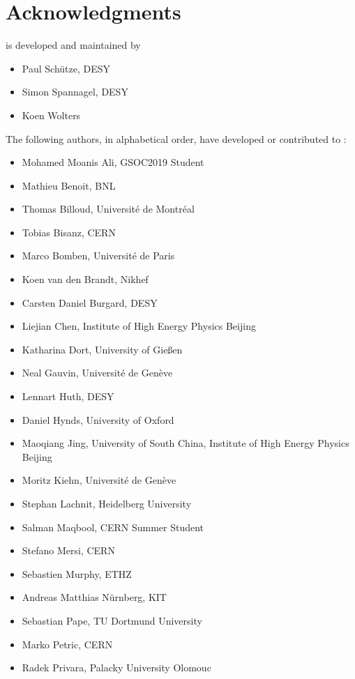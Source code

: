 \chapter{Acknowledgments}

\apsq is developed and maintained by

\begin{itemize}
    \item Paul Schütze, DESY
    \item Simon Spannagel, DESY
    \item Koen Wolters
\end{itemize}

The following authors, in alphabetical order, have developed or contributed to \apsq:

\begin{itemize}
\item Mohamed Moanis Ali, GSOC2019 Student
\item Mathieu Benoit, BNL
\item Thomas Billoud, Université de Montréal
\item Tobias Bisanz, CERN
\item Marco Bomben, Université de Paris
\item Koen van den Brandt, Nikhef
\item Carsten Daniel Burgard, DESY
\item Liejian Chen, Institute of High Energy Physics Beijing
\item Katharina Dort, University of Gie\ss en
\item Neal Gauvin, Université de Genève
\item Lennart Huth, DESY
\item Daniel Hynds, University of Oxford
\item Maoqiang Jing, University of South China, Institute of High Energy Physics Beijing
\item Moritz Kiehn, Université de Genève
\item Stephan Lachnit, Heidelberg University
\item Salman Maqbool, CERN Summer Student
\item Stefano Mersi, CERN
\item Sebastien Murphy, ETHZ
\item Andreas Matthias Nürnberg, KIT
\item Sebastian Pape, TU Dortmund University
\item Marko Petric, CERN
\item Radek Privara, Palacky University Olomouc

\end{itemize}
